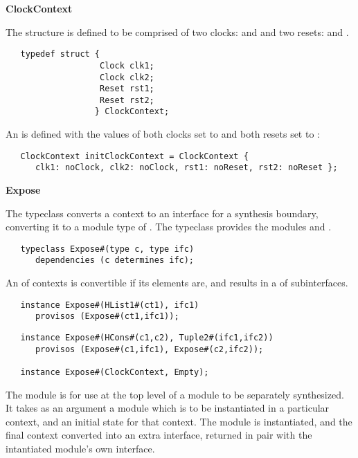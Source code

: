 {\bf ClockContext}

The structure  is defined to be comprised of two
clocks:  and  and two resets:  and
.

\begin{verbatim}
   typedef struct {
                   Clock clk1;
                   Clock clk2;
                   Reset rst1;
                   Reset rst2;
                  } ClockContext;
\end{verbatim}

An  is defined with the values of both clocks set to
 and both resets set to :

\begin{verbatim}
   ClockContext initClockContext = ClockContext {
      clk1: noClock, clk2: noClock, rst1: noReset, rst2: noReset };
\end{verbatim}

{\bf Expose}

The  typeclass converts a context to an interface for a
synthesis boundary, converting it to a module type of .
The  typeclass provides the modules  and
. 


\begin{verbatim}
   typeclass Expose#(type c, type ifc)
      dependencies (c determines ifc);
\end{verbatim}

 An  of contexts is
convertible if its elements are, and results in a  of subinterfaces.

\begin{verbatim}
   instance Expose#(HList1#(ct1), ifc1)
      provisos (Expose#(ct1,ifc1));
\end{verbatim}

\begin{verbatim}
   instance Expose#(HCons#(c1,c2), Tuple2#(ifc1,ifc2))
      provisos (Expose#(c1,ifc1), Expose#(c2,ifc2));
  
   instance Expose#(ClockContext, Empty);
\end{verbatim}


The  module is for use at the top level of a module
to be separately synthesized.  It takes as an argument a module which
is to be instantiated in a particular context, and an initial state
for that context.  The module is instantiated, and the final context
converted into an extra interface, returned in pair with the
intantiated module's own interface.

